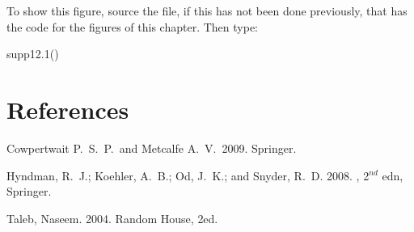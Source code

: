 To show this figure, source the file, if this has not been done
previously, that has the code for the figures of this chapter. Then
type:
\begin{Schunk}
\begin{Sinput}
supp12.1()
\end{Sinput}
\end{Schunk}

\section*{References}
\begin{itemizz}
\item[] Cowpertwait P.~S.~P.\ and Metcalfe A.~V.\ 2009.
 Springer.
\item[]
Hyndman, R.~J.; Koehler, A.~B.; Od, J.~K.; and Snyder, R.~D. 2008.
, 2$^{nd}$ edn, Springer.
\item[] Taleb, Naseem. 2004.   Random House, 2ed.
\end{itemizz}
